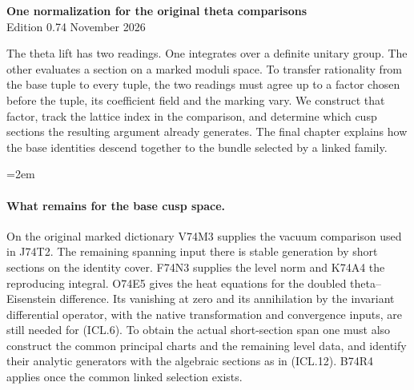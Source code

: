 \begin{center}
{\Large\bfseries One normalization for the original theta comparisons}\\[4pt]
Edition 0.74  November 2026
\end{center}

The theta lift has two readings. One integrates over a definite
unitary group. The other evaluates a section on a marked moduli
space. To transfer rationality from the base tuple to every tuple,
the two readings must agree up to a factor chosen before the tuple,
its coefficient field and the marking vary. We construct that
factor, track the lattice index in the comparison, and determine
which cusp sections the resulting argument already generates.
The final chapter explains how the base identities descend together
to the bundle selected by a linked family.

\begingroup\emergencystretch=2em










\paragraph{What remains for the base cusp space.}
On the original marked dictionary V74M3 supplies the vacuum
comparison used in J74T2. The remaining spanning input there is
stable generation by short sections on the identity cover. F74N3
supplies the level norm and K74A4 the reproducing integral. O74E5
gives the heat equations for the doubled theta--Eisenstein difference.
Its vanishing at zero and its annihilation by the invariant differential
operator, with the native transformation and convergence inputs,
are still needed for (ICL.6). To obtain the actual short-section
span one must also construct the common principal charts and the
remaining level data, and identify their analytic generators with the
algebraic sections as in (ICL.12). B74R4 applies once the common
linked selection exists.
\endgroup
